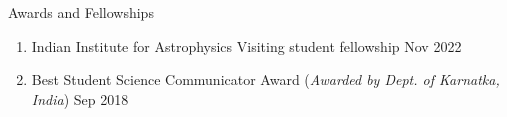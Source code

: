 \begin{rSection}{Awards and Fellowships} 
\begin{enumerate}[itemsep=-0.5em, leftmargin=0.5em]
    \item [] Indian Institute for Astrophysics Visiting student fellowship \hfill Nov 2022
    \item [] Best Student Science Communicator Award (\textit{Awarded by Dept. of Karnatka, India}) \hfill Sep 2018
\end{enumerate}
\end{rSection}